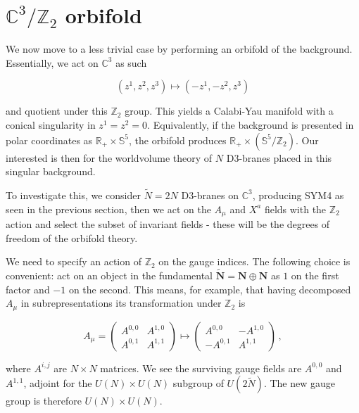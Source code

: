 \section{$\mathbb{C}^3/\mathbb{Z}_2$ orbifold}

We now move to a less trivial case by performing an orbifold of the background. Essentially, we act on $\mathbb{C}^3$ as such

\begin{equation}
	(z^1, z^2, z^3) \mapsto (-z^1, -z^2, z^3)
	\label{}
\end{equation}

and quotient under this $\mathbb{Z}_2$ group. This yields a Calabi-Yau manifold with a conical singularity in $z^1 = z^2 =0$. Equivalently, if the background is presented in polar coordinates as $\mathbb{R}_+ \times \mathbb{S}^5$, the orbifold produces $\mathbb{R}_+ \times (\mathbb{S}^5 / \mathbb{Z}_2)$. Our interested is then for the worldvolume theory of $N$ D3-branes placed in this singular background.

To investigate this, we consider $\tilde N = 2N$ D3-branes on $\mathbb{C}^3$, producing SYM4 as seen in the previous section, then we act on the $A_\mu$ and $X^a$ fields with the $\mathbb{Z}_2$ action and select the subset of invariant fields - these will be the degrees of freedom of the orbifold theory.

We need to specify an action of $\mathbb{Z}_2$ on the gauge indices. The following choice is convenient: act on an object in the fundamental $\mathbf{\tilde N} = \mathbf{N} \oplus \mathbf{N}$ as $1$ on the first factor and $-1$ on the second. This means, for example, that having decomposed $A_\mu$ in subrepresentations its transformation under $\mathbb{Z}_2$ is

\begin{equation}
	A_\mu = \begin{pmatrix}
		A^{0,0} & A^{1,0} \\
		A^{0,1} & A^{1,1}
	\end{pmatrix} \mapsto \begin{pmatrix}
		A^{0,0} & -A^{1,0} \\
		-A^{0,1} & A^{1,1}
	\end{pmatrix}\,,
\end{equation}

where $A^{i,j}$ are $N\times N$ matrices. We see the surviving gauge fields are $A^{0,0}$ and $A^{1,1}$, adjoint for the $U(N) \times U(N)$ subgroup of $U(2\tilde N)$. The new gauge group is therefore $U(N) \times U(N)$.

